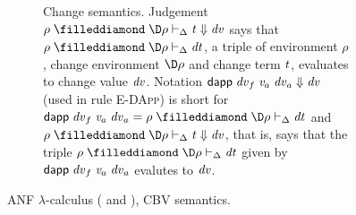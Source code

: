 \begin{figure}
\begin{subfigure}[t]{\textwidth}
\caption{Change semantics.
  Judgement \ensuremath{\rho\mathrel{\filleddiamond}\D\rho\vdash_{\Delta}\Varid{t}\;\negthickspace\Downarrow\negthickspace\;\Varid{dv}} says that \ensuremath{\rho\mathrel{\filleddiamond}\D\rho\vdash_{\Delta}\Varid{dt}}, a triple of environment
  \ensuremath{\rho}, change environment \ensuremath{\D\rho} and change term \ensuremath{\Varid{t}}, evaluates to change value \ensuremath{\Varid{dv}}.
  Notation \ensuremath{\mathsf{dapp}\;\Varid{dv}_f\;\Varid{v}_a\;\Varid{dv}_a\;\negthickspace\Downarrow\negthickspace\;\Varid{dv}} (used in rule \textsc{E-DApp}) is short
  for \ensuremath{\mathsf{dapp}\;\Varid{dv}_f\;\Varid{v}_a\;\Varid{dv}_a\mathrel{=}\rho\mathrel{\filleddiamond}\D\rho\vdash_{\Delta}\Varid{dt}} and
  \ensuremath{\rho\mathrel{\filleddiamond}\D\rho\vdash_{\Delta}\Varid{t}\;\negthickspace\Downarrow\negthickspace\;\Varid{dv}}, that is, says that the triple \ensuremath{\rho\mathrel{\filleddiamond}\D\rho\vdash_{\Delta}\Varid{dt}}
  given by \ensuremath{\mathsf{dapp}\;\Varid{dv}_f\;\Varid{v}_a\;\Varid{dv}_a} evalutes to \ensuremath{\Varid{dv}}.}
\label{sfig:anf-change-semantics}
\end{subfigure}

\caption{ANF $\lambda$-calculus (\ilcUntau{} and \dilcUntau{}), CBV semantics.}
\label{fig:anf-lambda-calculus-semantics}
\end{figure}
